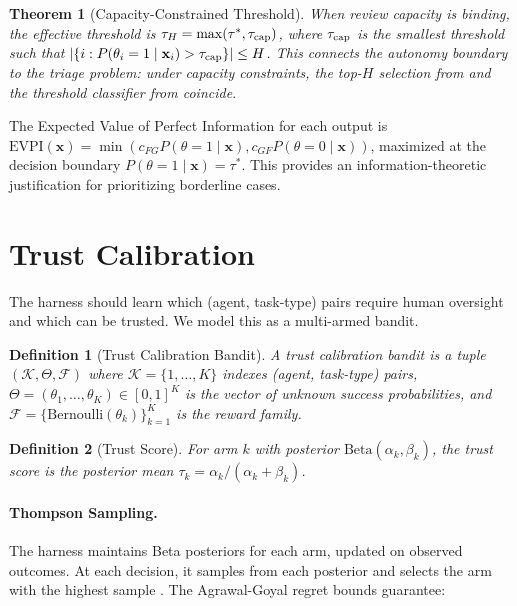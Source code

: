 \documentclass[11pt, a4paper, copyright]{googledeepmind}
\newtheorem{definition}{Definition}[section]
\newtheorem{theorem}{Theorem}[section]
\begin{document}
\begin{theorem}[Capacity-Constrained Threshold]
\label{thm:capacity-threshold}
When review capacity is binding, the effective threshold is $\tau_H = \max(\tau^*, \tau_{\textup{cap}})$, where $\tau_{\textup{cap}}$ is the smallest threshold such that $|\{i : P(\theta_i = 1 \mid \mathbf{x}_i) > \tau_{\textup{cap}}\}| \leq H$. This connects the autonomy boundary to the triage problem: under capacity constraints, the top-$H$ selection from  and the threshold classifier from  coincide.
\end{theorem}

The Expected Value of Perfect Information for each output is $\text{EVPI}(\mathbf{x}) = \min(c_{FG} P(\theta=1 \mid \mathbf{x}), c_{GF} P(\theta=0 \mid \mathbf{x}))$, maximized at the decision boundary $P(\theta=1 \mid \mathbf{x}) = \tau^*$. This provides an information-theoretic justification for prioritizing borderline cases.

\section{Trust Calibration}
\label{sec:trust}

The harness should learn which (agent, task-type) pairs require human oversight and which can be trusted. We model this as a multi-armed bandit.

\begin{definition}[Trust Calibration Bandit]
\label{def:trust-bandit}
A trust calibration bandit is a tuple $(\mathcal{K}, \Theta, \mathcal{F})$ where $\mathcal{K} = \{1, \ldots, K\}$ indexes (agent, task-type) pairs, $\Theta = (\theta_1, \ldots, \theta_K) \in [0,1]^K$ is the vector of unknown success probabilities, and $\mathcal{F} = \{\text{Bernoulli}(\theta_k)\}_{k=1}^K$ is the reward family.
\end{definition}

\begin{definition}[Trust Score]
\label{def:trust-score}
For arm $k$ with posterior $\text{Beta}(\alpha_k, \beta_k)$, the trust score is the posterior mean $\tau_k = \alpha_k / (\alpha_k + \beta_k)$.
\end{definition}

\paragraph{Thompson Sampling.} The harness maintains Beta posteriors for each arm, updated on observed outcomes. At each decision, it samples from each posterior and selects the arm with the highest sample \citep{thompson1933likelihood}. The Agrawal-Goyal regret bounds \citep{agrawal2012analysis} guarantee:
\end{document}
